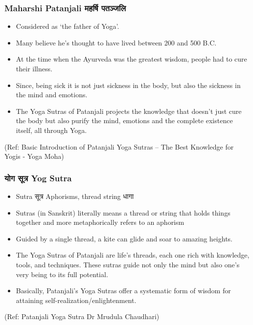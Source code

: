 \begin{frame}[fragile]\frametitle{Maharshi Patanjali महर्षि पतञ्जलि}

	\begin{itemize}
	\item Considered as `the father of Yoga'.
\item Many believe he’s thought to have lived between 200 and 500 B.C. 
\item At the time when the Ayurveda was the greatest wisdom, people had to cure their illness.	
\item Since, being sick it is not just sickness in the body, but also the sickness in the mind and emotions. 
\item The Yoga Sutras of Patanjali projects the knowledge that doesn’t just cure the body but also purify the mind, emotions and the complete existence itself, all through Yoga.
	\end{itemize}

\tiny{(Ref: Basic Introduction of Patanjali Yoga Sutras – The Best Knowledge for Yogis - Yoga Moha)}

\end{frame}



\begin{frame}[fragile]\frametitle{ योग सूत्र Yog Sutra}

	\begin{itemize}
	\item Sutra सूत्र Aphorisms, thread string धागा
	\item Sutras (in Sanskrit) literally means a thread or string that holds things together and more metaphorically refers to an aphorism	
	\item Guided by a single thread, a kite can glide and soar to amazing heights. 
	\item 	The Yoga Sutras of Patanjali are life’s threads, each one rich with knowledge, tools, and techniques. These sutras guide not only the mind but also one’s very being to its full potential. 
	\item 	Basically, Patanjali’s Yoga Sutras offer a systematic form of wisdom for attaining self-realization/enlightenment.
	\end{itemize}

\tiny{(Ref: Patanjali Yoga Sutra Dr Mrudula Chaudhari)}

\end{frame}


